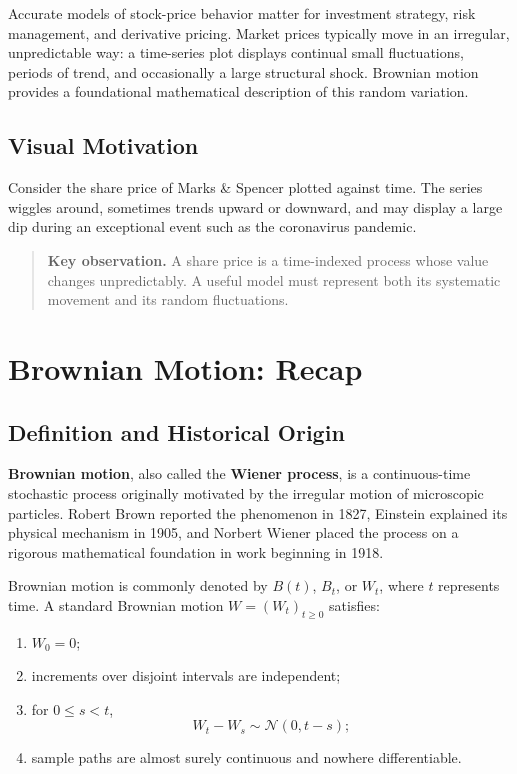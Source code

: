 \documentclass[12pt,openany]{book}
\theoremstyle{definition}
\theoremstyle{remark}
\begin{document}
Accurate models of stock-price behavior matter for investment strategy,
risk management, and derivative pricing. Market prices typically move in an
irregular, unpredictable way: a time-series plot displays continual small
fluctuations, periods of trend, and occasionally a large structural shock.
Brownian motion provides a foundational mathematical description of this
random variation.

\subsection{Visual Motivation}

Consider the share price of Marks \& Spencer plotted against time. The series
wiggles around, sometimes trends upward or downward, and may display a large
dip during an exceptional event such as the coronavirus pandemic.

\begin{quote}
\textbf{Key observation.} A share price is a time-indexed process whose value
changes unpredictably. A useful model must represent both its systematic
movement and its random fluctuations.
\end{quote}

\section{Brownian Motion: Recap}

\subsection{Definition and Historical Origin}

\textbf{Brownian motion}, also called the \textbf{Wiener process}, is a
continuous-time stochastic process originally motivated by the irregular
motion of microscopic particles. Robert Brown reported the phenomenon in
1827, Einstein explained its physical mechanism in 1905, and Norbert Wiener
placed the process on a rigorous mathematical foundation in work beginning
in 1918.

Brownian motion is commonly denoted by \(B(t)\), \(B_t\), or \(W_t\), where
\(t\) represents time. A standard Brownian motion
\(W=(W_t)_{t\geq0}\) satisfies:
\begin{enumerate}
    \item \(W_0=0\);
    \item increments over disjoint intervals are independent;
    \item for \(0\leq s<t\),
    \[
    W_t-W_s\sim\mathcal{N}(0,t-s);
    \]
    \item sample paths are almost surely continuous and nowhere
    differentiable.
\end{enumerate}
\end{document}
